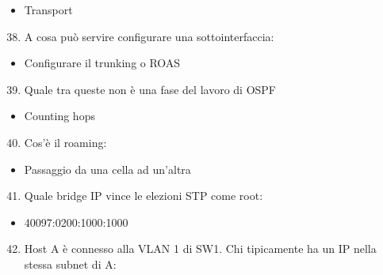 \documentclass[
]{article}
\providecommand{\tightlist}{%
  \setlength{\itemsep}{0pt}\setlength{\parskip}{0pt}}
\begin{document}
\begin{itemize}
\tightlist
\item
  {Transport}
\end{itemize}

{}

\begin{enumerate}
\setcounter{enumi}{37}
\tightlist
\item
  {A cosa può servire configurare una sottointerfaccia:}
\end{enumerate}

\begin{itemize}
\tightlist
\item
  {Configurare il trunking o ROAS}
\end{itemize}

{}

\begin{enumerate}
\setcounter{enumi}{38}
\tightlist
\item
  {Quale tra queste non è una fase del lavoro di OSPF}
\end{enumerate}

\begin{itemize}
\tightlist
\item
  {Counting hops}
\end{itemize}

{}

\begin{enumerate}
\setcounter{enumi}{39}
\tightlist
\item
  {Cos'è il roaming:}
\end{enumerate}

\begin{itemize}
\tightlist
\item
  {Passaggio da una cella ad un'altra}
\end{itemize}

{}

\begin{enumerate}
\setcounter{enumi}{40}
\tightlist
\item
  {Quale bridge IP vince le elezioni STP come root:}
\end{enumerate}

\begin{itemize}
\tightlist
\item
  {40097:0200:1000:1000}
\end{itemize}

{}

\begin{enumerate}
\setcounter{enumi}{41}
\tightlist
\item
  {Host A è connesso alla VLAN 1 di SW1. Chi tipicamente ha un IP nella
  stessa subnet di A:}
\end{enumerate}
\end{document}
